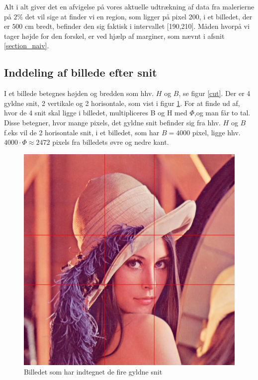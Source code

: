 Alt i alt giver det en afvigelse på vores aktuelle udtrækning af data
fra malerierne på $2\%$ det vil sige at finder vi en region, som ligger
på pixel 200, i et billedet, der er $500$ cm bredt, befinder den sig
faktisk i intervallet [190,210]. Måden hvorpå vi tager højde for den
forskel, er ved hjælp af marginer, som nævnt i afsnit
\ref{section_naiv}.

\subsection{Inddeling af billede efter snit}

I et billede betegnes højden og bredden som hhv. $H$ og $B$, se figur
\ref{cut}. Der er 4 gyldne snit, 2 vertikale og 2 horisontale, som vist
i figur \ref{lenasnit2}. For at finde ud af, hvor de 4 snit skal ligge i
billedet, multipliceres B og H med $\varPhi$,og man får to tal. Disse
betegner, hvor mange pixels, det gyldne snit befinder sig fra hhv. $H$
og $B$ f.eks vil de 2 horisontale snit, i et billedet, som har $B =
4000$ pixel, ligge hhv. $4000 \cdot \varPhi \approx 2472$ pixels fra
billedets øvre og nedre kant.

\begin{figure}[h]
	\begin{center}
		\includegraphics[scale=0.42,angle=0]{afsnit/vores_implementation/billeder/naiv_algoritme/Lenagolden}
	\end{center}
	\caption[]{Billedet som har indtegnet de fire gyldne snit}
	\label{lenasnit2}
\end{figure}

